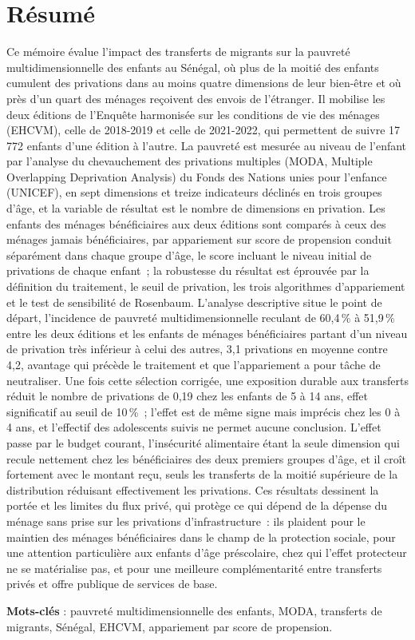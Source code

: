\section*{Résumé}

Ce mémoire évalue l'impact des transferts de
migrants sur la pauvreté multidimensionnelle des enfants au Sénégal, où
plus de la moitié des enfants cumulent des privations dans au moins
quatre dimensions de leur bien-être et où près d'un quart des ménages
reçoivent des envois de l'étranger. Il mobilise les deux éditions de
l'Enquête harmonisée sur les conditions de vie des ménages (EHCVM),
celle de 2018-2019 et celle de 2021-2022, qui permettent de suivre 17\,772
enfants d'une édition à l'autre. La pauvreté est mesurée au niveau de
l'enfant par l'analyse du chevauchement des privations multiples (MODA,
Multiple Overlapping Deprivation Analysis) du Fonds des Nations unies
pour l'enfance (UNICEF), en sept dimensions et treize
indicateurs déclinés en trois groupes d'âge, et la variable de résultat
est le nombre de dimensions en privation. Les enfants des ménages
bénéficiaires aux deux éditions sont comparés à ceux des ménages jamais
bénéficiaires, par appariement sur score de propension conduit
séparément dans chaque groupe d'âge, le score incluant le niveau initial
de privations de chaque enfant~; la robustesse du résultat est éprouvée
par la définition du traitement, le seuil de privation, les trois
algorithmes d'appariement et le test de sensibilité de Rosenbaum.
L'analyse descriptive situe le point de départ, l'incidence de pauvreté
multidimensionnelle reculant de 60,4\,\% à 51,9\,\% entre les deux
éditions et les enfants de ménages bénéficiaires partant d'un niveau de
privation très inférieur à celui des autres, 3,1 privations en moyenne
contre 4,2, avantage qui précède le traitement et que l'appariement a
pour tâche de neutraliser. Une fois cette sélection corrigée, une
exposition durable aux transferts réduit le nombre de privations de 0,19
chez les enfants de 5 à 14 ans, effet significatif au seuil de 10\,\%~;
l'effet est de même signe mais imprécis chez les 0 à 4 ans, et
l'effectif des adolescents suivis ne permet aucune conclusion. L'effet
passe par le budget courant, l'insécurité alimentaire étant la seule
dimension qui recule nettement chez les bénéficiaires des deux premiers
groupes d'âge, et il croît fortement avec le montant reçu, seuls les
transferts de la moitié supérieure de la distribution réduisant
effectivement les privations. Ces résultats dessinent la portée et les
limites du flux privé, qui protège ce qui dépend de la dépense du ménage
sans prise sur les privations d'infrastructure~: ils plaident pour le
maintien des ménages bénéficiaires dans le champ de la protection
sociale, pour une attention particulière aux enfants d'âge préscolaire,
chez qui l'effet protecteur ne se matérialise pas, et pour une meilleure
complémentarité entre transferts privés et offre publique de services de
base.

\bigskip

\noindent \textbf{Mots-clés} : pauvreté multidimensionnelle des enfants,
MODA, transferts de migrants, Sénégal, EHCVM, appariement par score de
propension.
